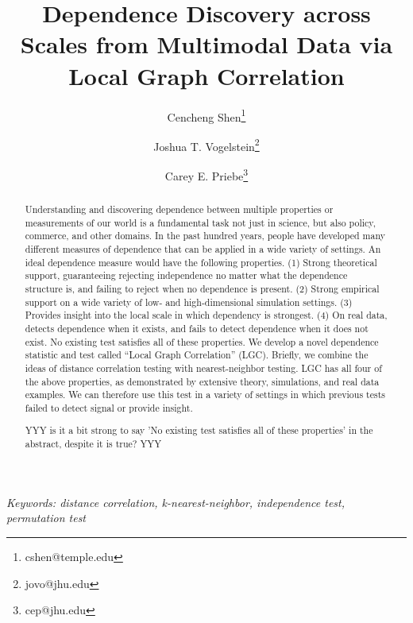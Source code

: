 \documentclass[11pt]{article}
\begin{document}
\def\spacingset#1{\renewcommand{\baselinestretch}%
{#1}\small\normalsize} \spacingset{1}

\title{\bf Dependence Discovery across Scales from Multimodal Data via Local Graph Correlation}
\author[1]{Cencheng Shen\thanks{cshen@temple.edu}}
\author[2]{Joshua T. Vogelstein\thanks{jovo@jhu.edu}}
\author[3]{Carey E. Priebe\thanks{cep@jhu.edu}}
\maketitle
\pagestyle{empty}

\bigskip
\begin{abstract}
Understanding and discovering dependence between multiple properties or measurements of our world is a fundamental task not just in science, but also policy, commerce, and other domains. In the past hundred years, people have developed many different measures of dependence that can be applied in a wide variety of settings.  An ideal dependence measure would have the following properties. (1) Strong theoretical support, guaranteeing rejecting independence no matter what the dependence structure is, and failing to reject when no dependence is present. (2) Strong empirical support on a wide variety of low- and high-dimensional simulation settings. (3) Provides insight into the local scale in which dependency is strongest. (4) On real data, detects dependence when it exists, and fails to detect dependence when it does not exist. No existing test satisfies all of these properties. We develop a novel dependence statistic and test called ``Local Graph Correlation'' (LGC).  Briefly, we combine the ideas of distance correlation testing with nearest-neighbor testing.  LGC has all four of the above properties, as demonstrated by extensive theory, simulations, and real data examples. We can therefore use this test in a variety of settings in which previous tests failed to detect signal or provide insight.

YYY is it a bit strong to say 'No existing test satisfies all of these properties' in the abstract, despite it is true? YYY
\end{abstract}

\noindent%
{\it Keywords: distance correlation, k-nearest-neighbor, independence test, permutation test}  
\vfill
\end{document}
